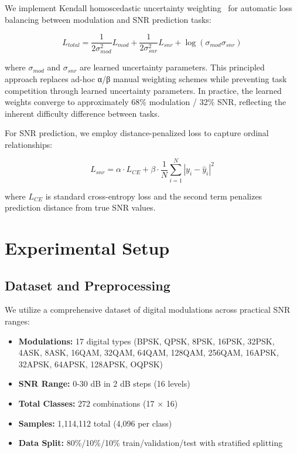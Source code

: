 \documentclass{ELSP}
\begin{document}
{{We implement Kendall homoscedastic uncertainty weighting~\cite{5} for automatic loss balancing between modulation and SNR prediction tasks:

\begin{equation}
L_{total} = \frac{1}{2\sigma_{mod}^2} L_{mod} + \frac{1}{2\sigma_{snr}^2} L_{snr} + \log(\sigma_{mod}\sigma_{snr})
\end{equation}

where $\sigma_{mod}$ and $\sigma_{snr}$ are learned uncertainty parameters. This principled approach replaces ad-hoc α/β manual weighting schemes while preventing task competition through learned uncertainty parameters. In practice, the learned weights converge to approximately 68\% modulation / 32\% SNR, reflecting the inherent difficulty difference between tasks.

For SNR prediction, we employ distance-penalized loss to capture ordinal relationships:

\begin{equation}
L_{snr} = \alpha \cdot L_{CE} + \beta \cdot \frac{1}{N} \sum_{i=1}^{N} |y_i - \hat{y}_i|^2
\end{equation}

where $L_{CE}$ is standard cross-entropy loss and the second term penalizes prediction distance from true SNR values.

\section{Experimental Setup}

\subsection{Dataset and Preprocessing}

We utilize a comprehensive dataset of digital modulations across practical SNR ranges:
\begin{itemize}
    \item \textbf{Modulations:} 17 digital types (BPSK, QPSK, 8PSK, 16PSK, 32PSK, 4ASK, 8ASK, 16QAM, 32QAM, 64QAM, 128QAM, 256QAM, 16APSK, 32APSK, 64APSK, 128APSK, OQPSK)
    \item \textbf{SNR Range:} 0-30 dB in 2 dB steps (16 levels)
    \item \textbf{Total Classes:} 272 combinations (17 × 16)
    \item \textbf{Samples:} 1,114,112 total (4,096 per class)
    \item \textbf{Data Split:} 80\%/10\%/10\% train/validation/test with stratified splitting
\end{itemize}

}}
\end{document}
